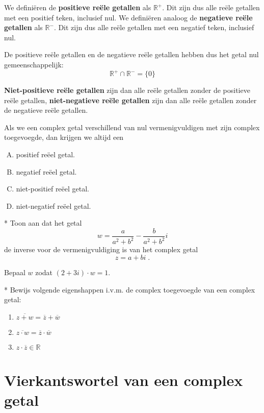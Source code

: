\documentclass[12pt,twoside]{article}
\begin{document}
\begin{oefening}
  We definiëren de {\bf positieve reële getallen} als $\mathbb{R}^+$. Dit zijn dus alle reële getallen met een positief teken, inclusief nul. We definiëren analoog de {\bf negatieve reële getallen} als $\mathbb{R}^-$. Dit zijn dus alle reële getallen met een negatief teken, inclusief nul.

  De positieve reële getallen en de negatieve reële getallen hebben dus het getal nul gemeenschappelijk:
  $$\mathbb{R}^+\cap\mathbb{R}^-=\{0\}$$

  {\bf Niet-positieve reële getallen} zijn dan alle reële getallen zonder de positieve reële getallen, {\bf niet-negatieve reële getallen} zijn dan alle reële getallen zonder de negatieve reële getallen.

  Als we een complex getal verschillend van nul vermenigvuldigen met zijn complex toegevoegde, dan krijgen we altijd een
  \begin{enumerate}[(A)]
  \item positief reëel getal.
  \item negatief reëel getal.
  \item niet-positief reëel getal.
  \item niet-negatief reëel getal.
  \end{enumerate}
\end{oefening}

\begin{oefening}*
Toon aan dat het getal
$$w=\dfrac{a}{a^2+b^2}-\dfrac{b}{a^2+b^2}i$$
de inverse voor de vermenigvuldiging is van het complex getal
$$z=a+bi\;.$$
\end{oefening}

\begin{oefening}
Bepaal $w$ zodat $(2+3i)\cdot w = 1$.
\end{oefening}

\begin{oefening}*
Bewijs volgende eigenshappen i.v.m. de complex toegevoegde van een complex getal:
\begin{enumerate}[a]
  \item $\overline{z+w}=\overline{z}+\overline{w}$
  \item $\overline{z\cdot w}=\overline{z}\cdot\overline{w}$
  \item $z\cdot\overline{z}\in\mathbb{R}$
\end{enumerate}
\end{oefening}

\pagebreak
\section{Vierkantswortel van een complex getal}
\end{document}
